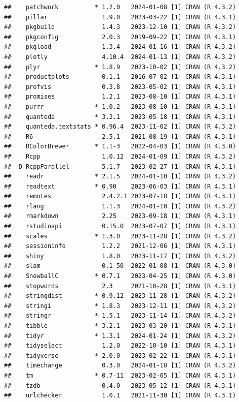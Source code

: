 \documentclass[print]{nuthesis}
\begin{document}
\begin{verbatim}
##    patchwork          * 1.2.0   2024-01-08 [1] CRAN (R 4.3.2)
##    pillar               1.9.0   2023-03-22 [1] CRAN (R 4.3.1)
##    pkgbuild             1.4.3   2023-12-10 [1] CRAN (R 4.3.2)
##    pkgconfig            2.0.3   2019-09-22 [1] CRAN (R 4.3.1)
##    pkgload              1.3.4   2024-01-16 [1] CRAN (R 4.3.2)
##    plotly               4.10.4  2024-01-13 [1] CRAN (R 4.3.2)
##    plyr               * 1.8.9   2023-10-02 [1] CRAN (R 4.3.2)
##    productplots         0.1.1   2016-07-02 [1] CRAN (R 4.3.1)
##    profvis              0.3.8   2023-05-02 [1] CRAN (R 4.3.1)
##    promises             1.2.1   2023-08-10 [1] CRAN (R 4.3.1)
##    purrr              * 1.0.2   2023-08-10 [1] CRAN (R 4.3.1)
##    quanteda           * 3.3.1   2023-05-18 [1] CRAN (R 4.3.1)
##    quanteda.textstats * 0.96.4  2023-11-02 [1] CRAN (R 4.3.2)
##    R6                   2.5.1   2021-08-19 [1] CRAN (R 4.3.1)
##    RColorBrewer       * 1.1-3   2022-04-03 [1] CRAN (R 4.3.0)
##    Rcpp                 1.0.12  2024-01-09 [1] CRAN (R 4.3.2)
##  D RcppParallel         5.1.7   2023-02-27 [1] CRAN (R 4.3.1)
##    readr              * 2.1.5   2024-01-10 [1] CRAN (R 4.3.2)
##    readtext           * 0.90    2023-06-03 [1] CRAN (R 4.3.1)
##    remotes              2.4.2.1 2023-07-18 [1] CRAN (R 4.3.1)
##    rlang                1.1.3   2024-01-10 [1] CRAN (R 4.3.2)
##    rmarkdown            2.25    2023-09-18 [1] CRAN (R 4.3.1)
##    rstudioapi           0.15.0  2023-07-07 [1] CRAN (R 4.3.1)
##    scales             * 1.3.0   2023-11-28 [1] CRAN (R 4.3.2)
##    sessioninfo          1.2.2   2021-12-06 [1] CRAN (R 4.3.1)
##    shiny                1.8.0   2023-11-17 [1] CRAN (R 4.3.2)
##    slam                 0.1-50  2022-01-08 [1] CRAN (R 4.3.0)
##    SnowballC          * 0.7.1   2023-04-25 [1] CRAN (R 4.3.0)
##    stopwords            2.3     2021-10-28 [1] CRAN (R 4.3.1)
##    stringdist         * 0.9.12  2023-11-28 [1] CRAN (R 4.3.2)
##    stringi            * 1.8.3   2023-12-11 [1] CRAN (R 4.3.2)
##    stringr            * 1.5.1   2023-11-14 [1] CRAN (R 4.3.2)
##    tibble             * 3.2.1   2023-03-20 [1] CRAN (R 4.3.1)
##    tidyr              * 1.3.1   2024-01-24 [1] CRAN (R 4.3.2)
##    tidyselect           1.2.0   2022-10-10 [1] CRAN (R 4.3.1)
##    tidyverse          * 2.0.0   2023-02-22 [1] CRAN (R 4.3.1)
##    timechange           0.3.0   2024-01-18 [1] CRAN (R 4.3.2)
##    tm                 * 0.7-11  2023-02-05 [1] CRAN (R 4.3.1)
##    tzdb                 0.4.0   2023-05-12 [1] CRAN (R 4.3.1)
##    urlchecker           1.0.1   2021-11-30 [1] CRAN (R 4.3.1)

\end{verbatim}
\end{document}
